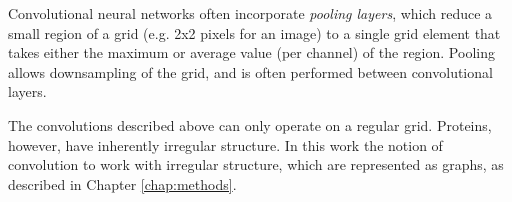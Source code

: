 Convolutional neural networks often incorporate \textit{pooling layers}, which reduce a small region of a grid (e.g. 2x2 pixels for an image) to a single grid element that takes either the maximum or average value (per channel) of the region. 
Pooling allows downsampling of the grid, and is often performed between convolutional layers. 

The convolutions described above can only operate on a regular grid. 
Proteins, however, have inherently irregular structure. 
In this work the notion of convolution to work with irregular structure, which are represented as graphs, as described in Chapter \ref{chap:methods}.





